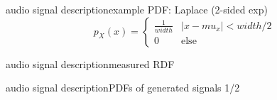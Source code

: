\begin{frame}{audio signal description}{example PDF: Laplace (2-sided exp)}
    \vspace{-5mm}
	\begin{equation*}
		p_X(x)= \left\lbrace  \begin{array}{ll}
		  \frac{1}{width} & |x-mu_x| < width/2 \\
		  0 & \textrm{else} 
	\end{array}\right.
	\end{equation*}
\end{frame}	

\begin{frame}{audio signal description}{measured RDF}
\end{frame}	
	
\begin{frame}{audio signal description}{PDFs of generated signals 1/2}
\end{frame}	
	

